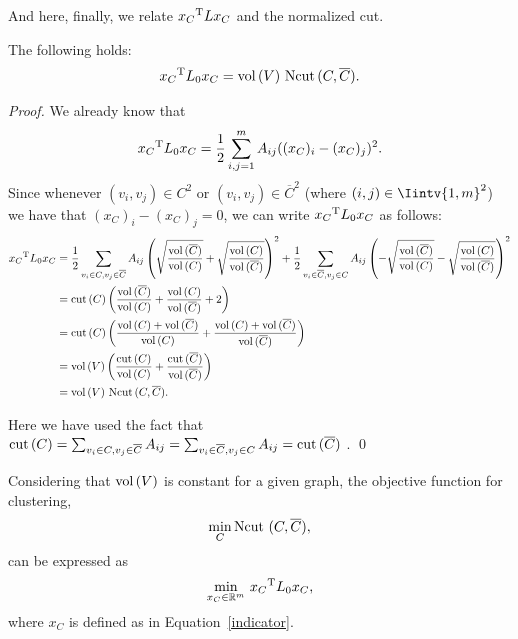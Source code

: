 And here, finally, we relate ${x_C}^{\rm T}L{x_C}$ and the normalized cut.

\begin{theorem}\label{xtxcut}
   The following holds:
   \begin{equation}
      {x_C}^{\rm T}L_0{x_C} = \operatorname*{vol\,}(V)\, \operatorname*{Ncut\,} (C, \overline C).
   \end{equation}
\end{theorem}

\begin{proof}
   We already know that
   \begin{equation*}
      {x_C}^{\rm T}L_0{x_C} = \frac{1}{2} \sum_{i,j=1}^m A_{ij} ((x_C)_i - (x_C)_j) ^2 .
   \end{equation*}
   Since whenever $(v_i, v_j) \in C^2$ or $(v_i, v_j) \in {\overline C}^2$ (where $(i,j) \in \Iintv{1,m}^2$) we have that $(x_C)_i - (x_C)_j = 0$, we can write ${x_C}^{\rm T}L_0{x_C}$ as follows:
   \begin{equation*}
      \begin{split}
         {x_C}^{\rm T}L_0{x_C} &=  \frac{1}{2} \sum_{v_i \in C, v_j \in \overline C}A_{ij} \left( \sqrt{\frac{\operatorname*{vol\,} (\overline C)}{\operatorname*{vol\,} (C)}} + \sqrt{\frac{\operatorname*{vol\,} (C)}{\operatorname*{vol\,} (\overline C)}} \right)^2 + \frac{1}{2} \sum_{v_i \in \overline C, v_j \in C} A_{ij} \left( -\sqrt{\frac{\operatorname*{vol\,} (\overline C)}{\operatorname*{vol\,} (C)}}  -\sqrt{\frac{\operatorname*{vol\,} (C)}{\operatorname*{vol\,} (\overline C)}} \right)^2 \\
         &= \operatorname{cut\,} (C) \left( \frac{\operatorname*{vol\,} (\overline C)}{\operatorname*{vol\,} (C)} + \frac{\operatorname*{vol\,} (C)}{\operatorname*{vol\,} (\overline C)} + 2 \right) \\
         &= \operatorname{cut\,} (C) \left( \frac{\operatorname*{vol\,} (C) + \operatorname*{vol\,} (\overline C)}{\operatorname*{vol\,} (C)} + \frac{\operatorname*{vol\,} (C) + \operatorname*{vol\,} (\overline C)}{\operatorname*{vol\,} (\overline C)} \right) \\
         &= \operatorname*{vol\,} (V) \left( \frac{\operatorname{cut\,}(C)}{\operatorname*{vol\,} (C)} + \frac{\operatorname{cut\,}(\overline C)}{\operatorname*{vol\,} (\overline C)} \right) \\
         &= \operatorname*{vol\,} (V)\, \operatorname*{Ncut\,}(C, \overline C).
      \end{split}
   \end{equation*}

Here we have used the fact that $\operatorname{cut\,}(C) = \sum_{v_i \in C, v_j \in \overline C} A_{ij} =\sum_{v_i \in \overline C, v_j \in C} A_{ij} = \operatorname{cut\,}(\overline C)$ . \qed
\end{proof}

Considering that $\operatorname*{vol\,} (V)$ is constant for a given graph, the objective function for clustering,
\begin{equation}
   \min_C \operatorname*{Ncut\,}\,(C, \overline C),
\end{equation}
can be expressed as
\begin{equation}\label{npequation}
   \min_{x_C \in \mathbb R^{m }} \,{x_C}^{\rm T} L_0 x_C \text{,}
\end{equation}
where $x_C$ is defined as in Equation~\vref{indicator}.

